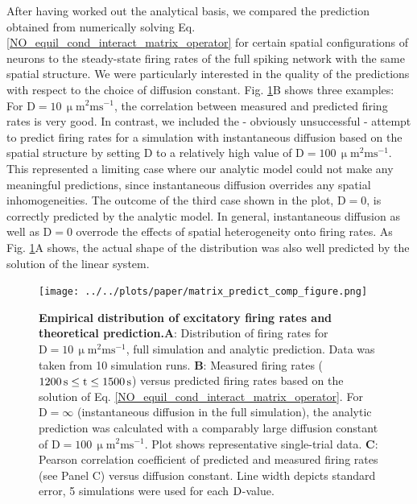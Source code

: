 \documentclass[10pt,letterpaper]{article}
\begin{document}
After having worked out the analytical basis, we compared the prediction obtained from numerically solving Eq. \eqref{NO_equil_cond_interact_matrix_operator} for certain spatial configurations of neurons to the steady-state firing rates of the full spiking network with the same spatial structure. We were particularly interested in the quality of the predictions with respect to the choice of diffusion constant. Fig. \ref{Matrix_Predict_Comp}B shows three examples: For $\mathrm{D=10\, \upmu m^2 ms^{-1}}$, the correlation between measured and predicted firing rates is very good. In contrast, we included the - obviously unsuccessful - attempt to predict firing rates for a simulation with instantaneous diffusion based on the spatial structure by setting D to a relatively high value of $\mathrm{D=100\, \upmu m^2 ms^{-1}}$. This represented a limiting case where our analytic model could not make any meaningful predictions, since instantaneous diffusion overrides any spatial inhomogeneities. The outcome of the third case shown in the plot, $\mathrm{D=0}$, is correctly predicted by the analytic model. In general, instantaneous diffusion as well as $\mathrm{D=0}$ overrode the effects of spatial heterogeneity onto firing rates. As Fig. \ref{Matrix_Predict_Comp}A shows, the actual shape of the distribution was also well predicted by the solution of the linear system.

\begin{figure}
\texttt{[image: ../../plots/paper/matrix\_predict\_comp\_figure.png]}
\caption{{\bf Empirical distribution of excitatory firing rates and theoretical prediction.}\textbf{A}: Distribution of firing rates for $\mathrm{D=10\, \upmu m^2 ms^{-1}}$, full simulation and analytic prediction. Data was taken from 10 simulation runs. \textbf{B}: Measured firing rates ($\rm 1200\,s \leq t \leq 1500\, s$) versus predicted firing rates based on the solution of Eq. \eqref{NO_equil_cond_interact_matrix_operator}. For $\mathrm{D=\infty}$ (instantaneous diffusion in the full simulation), the analytic prediction was calculated with a comparably large diffusion constant of $\mathrm{D=100\, \upmu m^2 ms^{-1}}$. Plot shows representative single-trial data. \textbf{C}: Pearson correlation coefficient of predicted and measured firing rates (see Panel C) versus diffusion constant. Line width depicts standard error, 5 simulations were used for each $\rm D$-value.}
\label{Matrix_Predict_Comp}
\end{figure}
\end{document}
